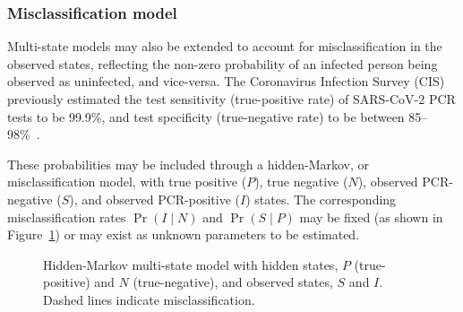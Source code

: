 \subsubsection{Misclassification model}

Multi-state models may also be extended to account for misclassification in the observed states, reflecting the non-zero probability of an infected person being observed as uninfected, and vice-versa. The Coronavirus Infection Survey (CIS) previously estimated the test sensitivity (true-positive rate) of SARS-CoV-2 PCR tests to be 99.9\%, and test specificity (true-negative rate) to be between 85--98\%~\parencite{Wei2023-ry}.

These probabilities may be included through a hidden-Markov, or misclassification model, with true positive ($P$), true negative ($N$), observed PCR-negative ($S$), and observed PCR-positive ($I$) states. The corresponding misclassification rates $\Pr(I \mid N)$ and $\Pr(S \mid P)$ may be fixed (as shown in Figure~\ref{fig:hidden-markov-model}) or may exist as unknown parameters to be estimated.

\begin{figure}[htbp!]
    \centering
    \caption[Hidden-Markov multi-state model with hidden states]{Hidden-Markov multi-state model with hidden states, $P$ (true-positive) and $N$ (true-negative), and observed states, $S$ and $I$. Dashed lines indicate misclassification.}\label{fig:hidden-markov-model}
\end{figure}

